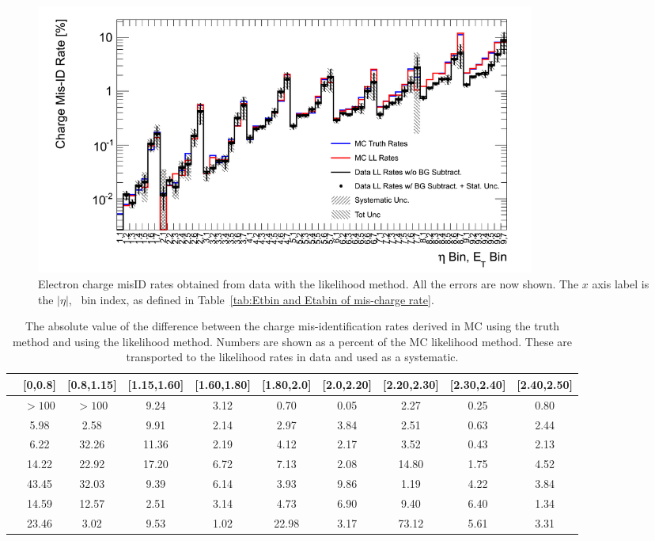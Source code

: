  \begin{figure}[htp]
 \centering
 \includegraphics[width=0.8\textwidth]{figures/ChargeMisID/Validation_ChargeMisIDRates_PTvsEta_FinalRateWithSys.png}
 \caption{Electron charge misID rates obtained from data with the likelihood method. All the errors are now shown. The $x$ axis label is
  the $|\eta|$, \pt\ bin index, as defined in Table~\ref{tab:Etbin and Etabin of mis-charge rate}.}
 \label{fig:ChargeMisID_truthRate_finalFig}
 \end{figure}

\begin{table}
\footnotesize
\centering
\begin{tabular}{c|c|c|c|c|c|c|c|c|c}
  \hline
  \backslashbox{\pt[\GeV]}{$|$\eta$|$} &[0,0.8] &[0.8,1.15] &[1.15,1.60] &[1.60,1.80] &[1.80,2.0] &[2.0,2.20] &[2.20,2.30] &[2.30,2.40] &[2.40,2.50] \\
  \hline
  [15,30] & $> 100$ & $> 100$ &9.24 &3.12 &0.70 &0.05 &2.27 &0.25 &0.80 \\
  \hline
  [30,40] & 5.98 &2.58 &9.91 &2.14 &2.97 &3.84 &2.51 &0.63 &2.44\\
  \hline
  [40,50] & 6.22 &32.26 &11.36 &2.19 &4.12 &2.17 &3.52 &0.43 &2.13 \\
  \hline
  [50,60] & 14.22 &22.92 &17.20 &6.72 &7.13 &2.08 &14.80 &1.75 &4.52 \\
  \hline
  [60,80] & 43.45 &32.03 &9.39 &6.14 &3.93 &9.86 &1.19 &4.22 &3.84 \\
  \hline
  [80,120] & 14.59 &12.57 &2.51 &3.14 &4.73 &6.90 &9.40 &6.40 &1.34 \\
  \hline
  [120,1000] & 23.46 &3.02 &9.53 &1.02 &22.98 &3.17 &73.12 &5.61 &3.31 \\
  \hline
\end{tabular}
\caption{The absolute value of the difference between the charge mis-identification rates derived in MC using the truth method and using the likelihood method.  Numbers
are shown as a percent of the MC likelihood method.  These are transported to the likelihood rates in data and used as a systematic. }
\label{tab:MCLLTruthSys}
\end{table}




